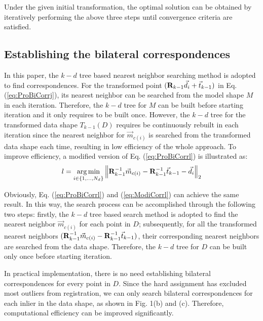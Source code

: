 \documentclass[review]{elsarticle}
\begin{document}
Under the given initial transformation, the optimal solution can be obtained by iteratively performing the above three steps until convergence criteria are satisfied.

\subsection{Establishing the bilateral correspondences}
In this paper, the $k-d$ tree based nearest neighbor searching method is adopted to find correspondences. For the transformed point $({{\bf{R}}_{k - 1}}{\vec d _i} + {\vec t _{k - 1}})$ in Eq. (\ref{eq:ProBiCorrj}), its nearest neighbor can be searched from the model shape $M$ in each iteration. Therefore, the $k-d$ tree for $M$ can be built before starting iteration and it only requires to be built once. However, the $k-d$ tree for the transformed data shape ${T_{k - 1}}(D)$ requires be continuously rebuilt in each iteration since the nearest neighbor for ${\vec m _{c(i)}}$ is searched from the transformed data shape each time, resulting in low efficiency of the whole approach. To improve efficiency, a modified version of Eq. (\ref{eq:ProBiCorrl}) is illustrated as:
\begin{equation}
{l = \mathop {\arg \min }\limits_{i \in \{ 1,...,{N_d}\} } {\left\| {{\bf{R}}_{k - 1}^{ - 1}{{\vec m }_{c(i)}} - {\bf{R}}_{k - 1}^{ - 1}{{\vec t }_{k - 1}} - {{\vec d }_i}} \right\|_2}}
\label{eq:ModiCorrl}
\end{equation}

Obviously, Eq. (\ref{eq:ProBiCorrl}) and (\ref{eq:ModiCorrl}) can achieve the same result. In this way, the search process can be accomplished through the following two steps: firstly, the $k-d$ tree based search method is adopted to find the nearest neighbor ${\vec m _{c(i)}}$ for each point in $D$; subsequently, for all the transformed nearest neighbors $({\bf{R}}_{k - 1}^{ - 1}{\vec m _{c(i)}} - {\bf{R}}_{k - 1}^{ - 1}{\vec t _{k - 1}})$, their corresponding nearest neighbors are searched from the data shape. Therefore, the $k-d$ tree for $D$ can be built only once before starting iteration.

In practical implementation, there is no need establishing bilateral correspondences for every point in $D$. Since the hard assignment has excluded most outliers from registration, we can only search bilateral correspondences for each inlier in the data shape, as shown in Fig. 1(b) and (c). Therefore, computational efficiency can be improved significantly.
\end{document}
